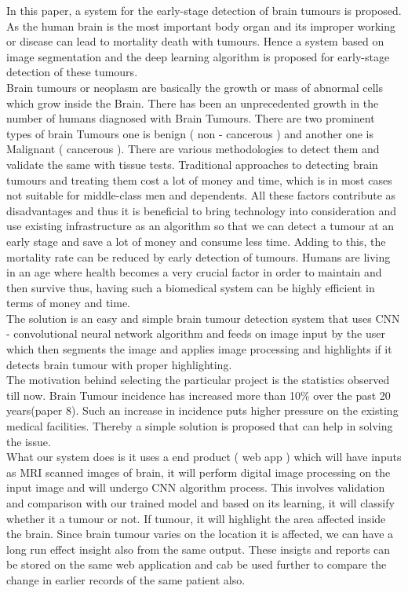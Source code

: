 {In this paper, a system for the early-stage detection of brain tumours is proposed. As the human brain is the most important body organ and its improper working or disease can lead to mortality death with tumours. Hence a system based on image segmentation and the deep learning algorithm is proposed for early-stage detection of these tumours. }\\

{Brain tumours or neoplasm are basically the growth or mass of abnormal cells which grow inside the Brain. There has been an unprecedented growth in the number of humans diagnosed with Brain Tumours. There are two prominent types of brain Tumours one is benign ( non - cancerous ) and another one is Malignant ( cancerous ). There are various methodologies to detect them and validate the same with tissue tests. Traditional approaches to detecting brain tumours and treating them cost a lot of money and time, which is in most cases not suitable for middle-class men and dependents. All these factors contribute as disadvantages and thus it is beneficial to bring technology into consideration and use existing infrastructure as an algorithm so that we can detect a tumour at an early stage and save a lot of money and consume less time. Adding to this, the mortality rate can be reduced by early detection of tumours. Humans are living in an age where health becomes a very crucial factor in order to maintain and then survive thus, having such a biomedical system can be highly efficient in terms of money and time.}\\

{The solution is an easy and simple brain tumour detection system that uses CNN - convolutional neural network algorithm and feeds on image input by the user which then segments the image and applies image processing and highlights if it detects brain tumour with proper highlighting.}\\

{The motivation behind selecting the particular project is the statistics observed till now. Brain Tumour incidence has increased more than 10\% over the past 20 years(paper 8). Such an increase in incidence puts higher pressure on the existing medical facilities. Thereby a simple solution is proposed that can help in solving the issue.}\\

{What our system does is it uses a end product ( web app ) which will have inputs as MRI scanned images of brain, it will perform digital image processing on the input image and will undergo CNN algorithm process. This involves validation and comparison with our trained model and based on its learning, it will classify whether it a tumour or not. If tumour, it will highlight the area affected inside the brain. Since brain tumour varies on the location it is affected, we can have a long run effect insight also from the same output. These insigts and reports can be stored on the same web application and cab be used further to compare the change in earlier records of the same patient also. }\\

